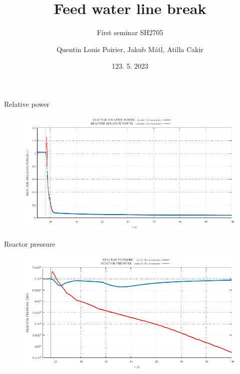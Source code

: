 

\title[APROS simulations of BWR transients]{Feed water line break}
\subtitle{First seminar SH2705}
\author{Quentin Louis Poirier, Jakub Mátl, Atilla Cakir}
\date[24/05/23]{123. 5. 2023}
\usepackage{comment}

\usepackage[style=authoryear-ibid,backend=biber]{biblatex}
\usepackage{pgfplots}
\pgfplotsset{compat=1.18}



\nologo %




\frame{\titlepage}


\begin{frame}{Relative power}
	\begin{figure}
		\centering
		\includegraphics[width=\textwidth]{./graphs/REACTOR RELATIVE POWER_comp.pdf}
		
	\end{figure}
\end{frame}


\begin{frame}{Reactor pressure}
	\begin{figure}
		\centering
		\includegraphics[width=\textwidth]{./graphs/REACTOR PRESSURE_comp.pdf}
		
	\end{figure}
	
\end{frame}


